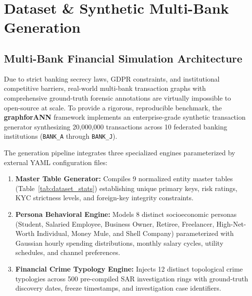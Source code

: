 \section{Dataset \&  Synthetic Multi-Bank Generation}
\label{sec:dataset}

\subsection{Multi-Bank Financial Simulation Architecture}
Due to strict banking secrecy laws, GDPR constraints, and institutional competitive barriers, real-world multi-bank transaction graphs with comprehensive ground-truth forensic annotations are virtually impossible to open-source at scale. To provide a rigorous, reproducible benchmark, the \textbf{graphforANN} framework implements an enterprise-grade synthetic transaction generator synthesizing 20,000,000 transactions across 10 federated banking institutions (\texttt{BANK\_A} through \texttt{BANK\_J}).

The generation pipeline integrates three specialized engines parameterized by external YAML configuration files:
\begin{enumerate}
    \item \textbf{Master Table Generator:} Compiles 9 normalized entity master tables (Table~\ref{tab:dataset_stats}) establishing unique primary keys, risk ratings, KYC strictness levels, and foreign-key integrity constraints.
    \item \textbf{Persona Behavioral Engine:} Models 8 distinct socioeconomic personas (Student, Salaried Employee, Business Owner, Retiree, Freelancer, High-Net-Worth Individual, Money Mule, and Shell Company) parameterized with Gaussian hourly spending distributions, monthly salary cycles, utility schedules, and channel preferences.
    \item \textbf{Financial Crime Typology Engine:} Injects 12 distinct topological crime typologies across 500 pre-compiled SAR investigation rings with ground-truth discovery dates, freeze timestamps, and investigation case identifiers.
\end{enumerate}

